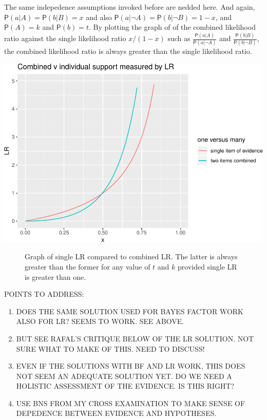 \documentclass[10pt,dvipsnames,enabledeprecatedfontcommands]{scrartcl}
\newcommand{\pr}[1]{\mathsf{P}(#1)}
\begin{document}
\noindent The same indepedence assumptions invoked before are nedded
here. And again, \(\pr{a |A}=\pr{b |B}=x\) and also
\(\pr{a |\neg A}=\pr{b | \neg B}=1-x\), and \(\pr{A}=k\) and
\(\pr{b}=t\). By plotting the graph of of the combined likelihood ratio
against the single likelihood ratio \(x/(1-x)\) such as
\(\frac{\pr{a |A}}{\pr{a | \neg A}}\) and
\(\frac{\pr{b |B}}{\pr{b | \neg B}}\), the combined likelihood ratio is
always greater than the single likelihood ratio.

\includegraphics{burden-proof2_files/figure-latex/unnamed-chunk-1-1.pdf}

\begin{figure} 
 \caption{Graph of single LR compared to combined LR. The latter is always 
 greater than the former for any value of $t$ and $k$ provided single LR is greater than one.}
\label{conjunction-LR}
\end{figure}

POINTS TO ADDRESS:

\begin{enumerate}
\def\labelenumi{(\arabic{enumi})}
\item
  DOES THE SAME SOLUTION USED FOR BAYES FACTOR WORK ALSO FOR LR? SEEMS
  TO WORK. SEE ABOVE.
\item
  BUT SEE RAFAL'S CRITIQUE BELOW OF THE LR SOLUTION. NOT SURE WHAT TO
  MAKE OF THIS. NEED TO DISCUSS!
\item
  EVEN IF THE SOLUTIONS WITH BF AND LR WORK, THIS DOES NOT SEEM AN
  ADEQUATE SOLUTION YET. DO WE NEED A HOLISTIC ASSESSMENT OF THE
  EVIDENCE. IS THIS RIGHT?
\item
  USE BNS FROM MY CROSS EXAMINATION TO MAKE SENSE OF DEPEDENCE BETWEEN
  EVIDENCE AND HYPOTHESES.
\end{enumerate}
\end{document}
